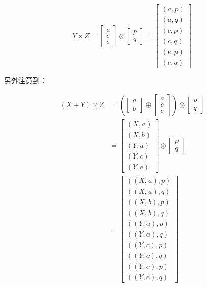 \documentclass[10pt, openany]{book}
\begin{document}
\[
Y \times Z = \begin{bmatrix}a\\c\\e\end{bmatrix} \otimes \begin{bmatrix}p\\q\end{bmatrix}
= \begin{bmatrix}(a,p)\\(a,q)\\(c,p)\\(c,q)\\(e,p)\\(e,q)\end{bmatrix}
\]

另外注意到：

\[
\begin{aligned}
(X+Y) \times Z &= 
\left( \begin{bmatrix}a\\b\end{bmatrix} \oplus 
\begin{bmatrix}a\\c\\e\end{bmatrix} \right) \otimes 
\begin{bmatrix}p\\q\end{bmatrix} \\
&= \begin{bmatrix}(X,a)\\(X,b)\\(Y,a)\\(Y,c)\\(Y,e)\end{bmatrix}
\otimes 
\begin{bmatrix}p\\q\end{bmatrix} \\
&= \begin{bmatrix}
((X,a),p)\\ ((X,a),q)\\
((X,b),p)\\ ((X,b),q)\\
((Y,a),p)\\ ((Y,a),q)\\
((Y,c),p)\\ ((Y,c),q)\\
((Y,e),p)\\ ((Y,e),q)
\end{bmatrix}
\end{aligned}
\]
\end{document}
